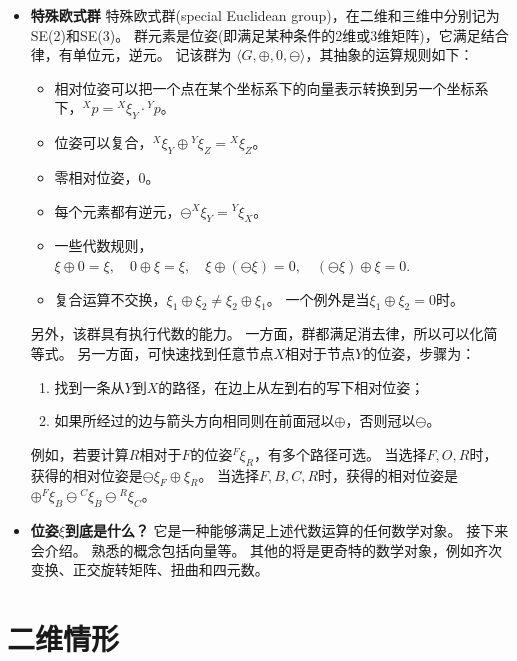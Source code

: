 \documentclass[UTF8,a4paper,10pt]{ctexart}
\begin{document}
\begin{itemize}
\item{\textbf{特殊欧式群}}
  特殊欧式群(special Euclidean group)，在二维和三维中分别记为SE(2)和SE(3)。
  群元素是位姿(即满足某种条件的2维或3维矩阵)，它满足结合律，有单位元，逆元。
  记该群为 $\langle G,\oplus,0,\ominus\rangle$，其抽象的运算规则如下：
  \begin{itemize}
  \item {相对位姿可以把一个点在某个坐标系下的向量表示转换到另一个坐标系下}，${}^Xp={}^X\xi_Y\cdot{}^Yp$。
  \item{位姿可以复合}，${}^X\xi_Y\oplus{}^Y\xi_Z={}^X\xi_Z$。
  \item{零相对位姿，$0$}。
  \item{每个元素都有逆元}，$\ominus{}^X\xi_Y={}^Y\xi_X$。
  \item{一些代数规则}，
    $
    \xi\oplus0=\xi,\quad0\oplus\xi=\xi,\quad\xi\oplus(\ominus\xi)=0,\quad(\ominus\xi)\oplus\xi=0.
    $
  \item {复合运算不交换}，$\xi_1\oplus\xi_2\ne\xi_2\oplus\xi_1$。
    一个例外是当$\xi_1\oplus\xi_2=0$时。
  \end{itemize}
  另外，该群具有执行代数的能力。
  一方面，群都满足消去律，所以可以化简等式。
  另一方面，可快速找到任意节点$X$相对于节点$Y$的位姿，步骤为：
  \begin{enumerate}
  \item 找到一条从$Y$到$X$的路径，在边上从左到右的写下相对位姿；
  \item 如果所经过的边与箭头方向相同则在前面冠以$\oplus$，否则冠以$\ominus$。
  \end{enumerate}
  例如，若要计算$R$相对于$F$的位姿${}^F\xi_R$，有多个路径可选。
  当选择$F,O,R$时，获得的相对位姿是$\ominus\xi_F\oplus\xi_R$。
  当选择$F,B,C,R$时，获得的相对位姿是$\oplus{}^F\xi_B\ominus{}^C\xi_B\ominus{}^R\xi_C$。
\item{\textbf{位姿$\xi$到底是什么？}}
  它是一种能够满足上述代数运算的任何数学对象。
  接下来会介绍。
  熟悉的概念包括向量等。
  其他的将是更奇特的数学对象，例如齐次变换、正交旋转矩阵、扭曲和四元数。
\end{itemize}

\section{二维情形}\label{sec:2D}
\end{document}
